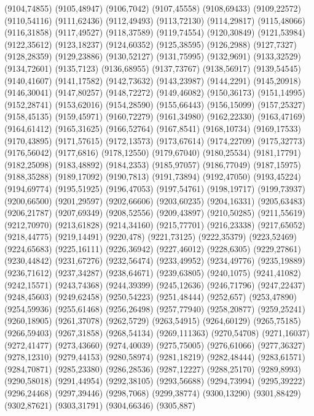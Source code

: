 (9104,74855)
(9105,48947)
(9106,7042)
(9107,45558)
(9108,69433)
(9109,22572)
(9110,54116)
(9111,62436)
(9112,49493)
(9113,72130)
(9114,29817)
(9115,48066)
(9116,31858)
(9117,49527)
(9118,37589)
(9119,74554)
(9120,30849)
(9121,53984)
(9122,35612)
(9123,18237)
(9124,60352)
(9125,38595)
(9126,2988)
(9127,7327)
(9128,28359)
(9129,23886)
(9130,52127)
(9131,75995)
(9132,9691)
(9133,32529)
(9134,72601)
(9135,7123)
(9136,68955)
(9137,73767)
(9138,56917)
(9139,54545)
(9140,41607)
(9141,17582)
(9142,73632)
(9143,23987)
(9144,2291)
(9145,20918)
(9146,30041)
(9147,80257)
(9148,72272)
(9149,46082)
(9150,36173)
(9151,14995)
(9152,28741)
(9153,62016)
(9154,28590)
(9155,66443)
(9156,15099)
(9157,25327)
(9158,45135)
(9159,45971)
(9160,72279)
(9161,34980)
(9162,22330)
(9163,47169)
(9164,61412)
(9165,31625)
(9166,52764)
(9167,8541)
(9168,10734)
(9169,17533)
(9170,43895)
(9171,57615)
(9172,13573)
(9173,67614)
(9174,22709)
(9175,32773)
(9176,56042)
(9177,6816)
(9178,12550)
(9179,67040)
(9180,25534)
(9181,17791)
(9182,25098)
(9183,48892)
(9184,2353)
(9185,97057)
(9186,77049)
(9187,15975)
(9188,35288)
(9189,17092)
(9190,7813)
(9191,73894)
(9192,47050)
(9193,45224)
(9194,69774)
(9195,51925)
(9196,47053)
(9197,54761)
(9198,19717)
(9199,73937)
(9200,66500)
(9201,29597)
(9202,66606)
(9203,60235)
(9204,16331)
(9205,63483)
(9206,21787)
(9207,69349)
(9208,52556)
(9209,43897)
(9210,50285)
(9211,55619)
(9212,70970)
(9213,61828)
(9214,34160)
(9215,77701)
(9216,23338)
(9217,65052)
(9218,44775)
(9219,14491)
(9220,478)
(9221,73125)
(9222,35379)
(9223,52469)
(9224,65683)
(9225,16111)
(9226,36942)
(9227,46012)
(9228,6305)
(9229,27861)
(9230,44842)
(9231,67276)
(9232,56474)
(9233,49952)
(9234,49776)
(9235,19889)
(9236,71612)
(9237,34287)
(9238,64671)
(9239,63805)
(9240,1075)
(9241,41082)
(9242,15571)
(9243,74368)
(9244,39399)
(9245,12636)
(9246,71796)
(9247,22437)
(9248,45603)
(9249,62458)
(9250,54223)
(9251,48444)
(9252,657)
(9253,47890)
(9254,59936)
(9255,61468)
(9256,26498)
(9257,77940)
(9258,20877)
(9259,25241)
(9260,18905)
(9261,37078)
(9262,5729)
(9263,54915)
(9264,60129)
(9265,75185)
(9266,59403)
(9267,31858)
(9268,54134)
(9269,111363)
(9270,54708)
(9271,16037)
(9272,41477)
(9273,43660)
(9274,40039)
(9275,75005)
(9276,61066)
(9277,36327)
(9278,12310)
(9279,44153)
(9280,58974)
(9281,18219)
(9282,48444)
(9283,61571)
(9284,70871)
(9285,23380)
(9286,28536)
(9287,12227)
(9288,25170)
(9289,8993)
(9290,58018)
(9291,44954)
(9292,38105)
(9293,56688)
(9294,73994)
(9295,39222)
(9296,24468)
(9297,39446)
(9298,7068)
(9299,38774)
(9300,13290)
(9301,88429)
(9302,87621)
(9303,31791)
(9304,66346)
(9305,887)
